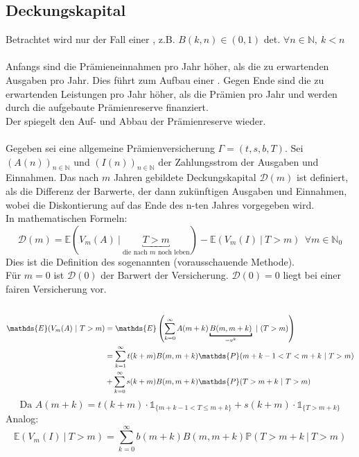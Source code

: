 \subsection{Deckungskapital}
\label{sub:deckungskapital}
Betrachtet wird nur der Fall einer , z.B. $B(k,n) \in (0,1)$ det. $\forall n \in \mathds{N},~k<n$\\
\\
Anfangs sind die Prämieneinnahmen pro Jahr höher, als die zu erwartenden Ausgaben pro Jahr. Dies führt zum Aufbau einer . Gegen Ende sind die zu erwartenden Leistungen pro Jahr höher, als die Prämien pro Jahr und werden durch die aufgebaute Prämienreserve finanziert.\\
Der  spiegelt den Auf- und Abbau der Prämienreserve wieder.\\
\\
Gegeben sei eine allgemeine Prämienversicherung $\Gamma=(t,s,b,T)$. Sei $(A(n))_{n\in \mathds{N}}$ und $(I(n))_{n\in \mathds{N}}$ der Zahlungsstrom der Ausgaben und Einnahmen. Das nach $m$ Jahren gebildete Deckungskapital $\mathcal{D}(m)$ ist definiert, als die Differenz der Barwerte, der dann zukünftigen Ausgaben und Einnahmen, wobei die Diskontierung auf das Ende des n-ten Jahres vorgegeben wird.\\
In mathematischen Formeln: 
\[
\mathcal{D}(m)= \mathds{E}(V_m(A)~|~\underbracket{T>m}_{\text{die nach $m$ noch leben}})- \mathds{E}(V_m(I)~|~T>m) ~~ \forall m\in \mathds{N}_0 
\]
Dies ist die Definition des sogenannten  (vorausschauende Methode).\\
Für $m=0$ ist $\mathcal{D}(0)$ der Barwert der Versicherung. $\mathcal{D}(0)=0$ liegt bei einer fairen Versicherung vor.\\
\\
\begin{equation*}
\begin{aligned}
	\mathds{E}(V_m(A)~|~T>m) &= \mathds{E}\enbrace{\sum_{k=0}^{\infty}A(m+k)\underbracket{B(m,m+k)}_{=v^k}~|~(T>m)}\\
	&= \sum_{k=1}^{\infty}t(k+m)B(m,m+k) \mathds{P}(m+k-1<T<m+k~|~T>m)\\
	&+ \sum_{k=0}^{\infty}s(k+m)B(m,m+k) \mathds{P}(T>m+k~|~T>m)	
\end{aligned}
\end{equation*}
\[ \text{Da } A(m+k) = t(k+m)\cdot \mathbb{1}_{\{m+k-1<T \le m+k \}} + s(k+m)\cdot \mathbb{1}_{\{T>m+k \}}\]
Analog:
\[ \mathds{E}(V_m(I)~|~T>m)= \sum_{k=0}^{\infty}b(m+k)B(m,m+k) \mathds{P}(T>m+k~|~T>m) \]

